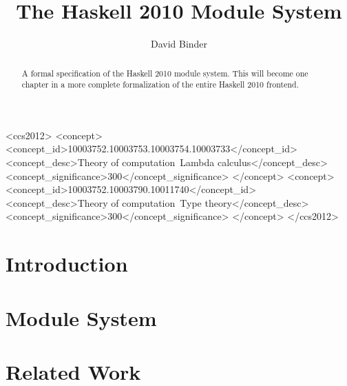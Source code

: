 \documentclass[review]{jfp-epi}
\begin{document}
\title{The Haskell 2010 Module System}



\begin{CCSXML}
  <ccs2012>
  <concept>
  <concept_id>10003752.10003753.10003754.10003733</concept_id>
  <concept_desc>Theory of computation~Lambda calculus</concept_desc>
  <concept_significance>300</concept_significance>
  </concept>
  <concept>
  <concept_id>10003752.10003790.10011740</concept_id>
  <concept_desc>Theory of computation~Type theory</concept_desc>
  <concept_significance>300</concept_significance>
  </concept>
  </ccs2012>
\end{CCSXML}


\author{David Binder}

\begin{abstract}
  A formal specification of the Haskell 2010 module system.
  This will become one chapter in a more complete formalization of the entire Haskell 2010 frontend.
\end{abstract}


\maketitle


\section{Introduction}
\label{sec:introduction}


\section{Module System}
\label{sec:module-system}



\section{Related Work}
\label{sec:related-work}



\end{document}
